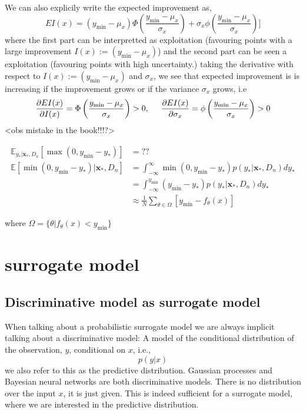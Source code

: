 We can also explicily write the expected improvement as, 
$$EI(x) = (y_{\min}-\mu_x)\Phi\left(\frac{y_{\min}-\mu_x}{\sigma_x}\right)+ \sigma_x
\phi\left(\frac{y_{\min}-\mu_x}{\sigma_x}\right)]$$
where the first part can be interpretted as exploitation (favouring points with a large improvement $I(x) := (y_{\min}-\mu_x)$)
and the second part can be seen a exploitation (favouring points with high uncertainty.)
taking the derivative with respect to $I(x) := (y_{\min}-\mu_x)$ and $\sigma_x$, we see that expected improvement is 
is increasing if the improvement grows or if the variance $\sigma_x$ grows, i.e
$$\frac{\partial EI(x)}{\partial I(x)} = \Phi\left(\frac{y_{\min}-\mu_x}{\sigma_x}\right) > 0, \hspace*{0.5cm} 
\frac{\partial EI(x)}{\partial \sigma_x} = \phi\left(\frac{y_{\min}-\mu_x}{\sigma_x}\right) >0$$ 
<obs mistake in the book!!!?>





\begin{align*}
    \mathbb{E}_{y_*|\textbf{x}_*,D_n}[\max(0,y_{\min}-y_*)] &= ??\\
    \mathbb{E}[\min(0,y_{\min}-y_*)|\textbf{x}_*,D_n] &= \int_{-\infty}^\infty \min(0,y_{\min}-y_*) p(y_*|\textbf{x}_*,D_n) dy_*\\
    &= \int_{-\infty}^{y_{\min}} (y_{\min}-y_*) p(y_*|\textbf{x}_*,D_n) dy_*\\
    &\approx \frac{1}{N} \sum_{\theta \in \Omega } [y_{\min}-f_\theta(x)]
\end{align*}

where $\Omega = \{\theta|f_{\theta}(x)< y_{\min}\}$



\section{surrogate model}

\subsection{Discriminative model as surrogate model}
When talking about a probabilistic surrogate model we are always implicit talking about a
discriminative model: A model of the conditional distribution of the observation, $y$, 
conditional on $x$, i.e., 
$$p(y|x)$$
we also refer to this as the predictive distribution. Gaussian processes and Bayesian neural networks
are both discriminative models. There is no distribution over the input $x$, it is just given. 
This is indeed sufficient for a surrogate model, where we are interested in the predictive distribution. 

